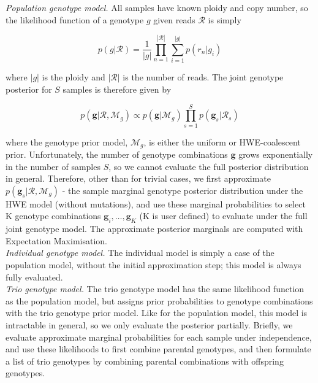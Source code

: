 \documentclass[notitlepage, twocolumn]{article}
\begin{document}
\emph{Population genotype model.} All samples have known ploidy and copy number, so the likelihood function of a genotype $g$ given reads $\mathcal{R}$ is simply

\begin{equation*}
	p(g | \mathcal{R}) = \frac{1}{|g|} \prod_{n=1}^{|\mathcal{R}|} \sum_{i = 1}^{|g|} p(r_n | g_{i})
\end{equation*}

where $|g|$ is the ploidy and $|\mathcal{R}|$ is the number of reads. The joint genotype posterior for $S$ samples is therefore given by

\begin{equation*}
	p(\boldsymbol{g} | \boldsymbol{\mathcal{R}}, \mathcal{M}_g) \propto p(\boldsymbol{g} | \mathcal{M}_g) \prod_{s=1}^S p(\boldsymbol{g}_s | \boldsymbol{\mathcal{R}}_s)
\end{equation*}

where the genotype prior model, $\mathcal{M}_g$, is either the uniform or HWE-coalescent prior. Unfortunately, the number of genotype combinations $\boldsymbol{g}$ grows exponentially in the number of samples $S$, so we cannot evaluate the full posterior distribution in general. Therefore, other than for trivial cases, we first approximate $p(\boldsymbol{g}_s | \boldsymbol{\mathcal{R}}, \mathcal{M}_g)$ - the sample marginal genotype posterior distribution under the HWE model (without mutations), and use these marginal probabilities to select K genotype combinations $\boldsymbol{g}_i, \dots, \boldsymbol{g}_K$ (K is user defined) to evaluate under the full joint genotype model. The approximate posterior marginals are computed with Expectation Maximisation.\\

\emph{Individual genotype model.} The individual model is simply a case of the population model, without the initial approximation step; this model is always fully evaluated.\\

\emph{Trio genotype model.} The trio genotype model has the same likelihood function as the population model, but assigns prior probabilities to genotype combinations with the trio genotype prior model. Like for the population model, this model is intractable in general, so we only evaluate the posterior partially. Briefly, we evaluate approximate marginal probabilities for each sample under independence, and use these likelihoods to first combine parental genotypes, and then formulate a list of trio genotypes by combining parental combinations with offspring genotypes.\\
\end{document}
